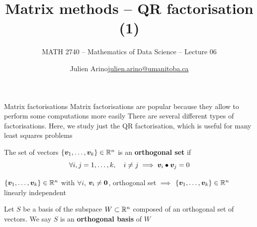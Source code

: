 \documentclass[aspectratio=169]{beamer}\usepackage[]{graphicx}\usepackage[]{xcolor}
\subtitle{MATH 2740 -- Mathematics of Data Science -- Lecture 06}
\author{\texorpdfstring{Julien Arino\newline\url{julien.arino@umanitoba.ca}}{Julien Arino}}
\institute{Department of Mathematics @ University of Manitoba}
\title{Matrix methods -- QR factorisation (1)}
\begin{document}
\setcounter{theorem}{56}





\begin{frame}{Matrix factorisations}
	Matrix factorisations are popular because they allow to perform some computations more easily
	\vfill
	There are several different types of factorisations. Here, we study just the QR factorisation, which is useful for many least squares problems
\end{frame}	
	


\begin{frame}
\begin{definition}
The set of vectors $\{\bm{v}_1,\ldots,\bm{v}_k\}\in\mathbb{R}^n$ is an \textbf{orthogonal set} if
\[
\forall i,j=1,\ldots,k,\quad i\neq j \implies \bm{v}_i\bullet\bm{v}_j=0
\]
\end{definition}
\vfill
\begin{theorem}\label{th:ortho_implies_LI}
$\{\bm{v}_1,\ldots,\bm{v}_k\}\in\mathbb{R}^n$ with $\forall i$, $\bv_i\neq\b0$, orthogonal set $\implies$ $\{\bm{v}_1,\ldots,\bm{v}_k\}\in\mathbb{R}^n$ linearly independent
\end{theorem}
\vfill
\begin{definition}
Let $S$ be a basis of the subspace $W\subset\mathbb{R}^n$ composed of an orthogonal set of vectors. We say $S$ is an \textbf{orthogonal basis} of $W$
\end{definition}
\end{frame}
\end{document}
